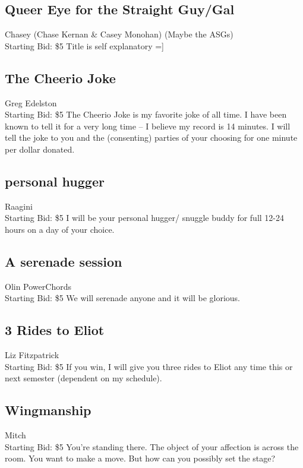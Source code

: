 \documentclass[11pt]{article}
\begin{document}
\subsection{Queer Eye for the Straight Guy/Gal}
Chasey (Chase Kernan  \& Casey Monohan) (Maybe the ASGs)
\\
Starting Bid: \$5
\newline
Title is self explanatory =]
\subsection{The Cheerio Joke}
Greg Edelston
\\
Starting Bid: \$5
\newline
The Cheerio Joke is my favorite joke of all time. I have been known to tell it for a very long time -- I believe my record is 14 minutes. I will tell the joke to you and the (consenting) parties of your choosing for one minute per dollar donated.
\subsection{personal hugger}
Raagini
\\
Starting Bid: \$5
\newline
I will be your personal hugger/ snuggle buddy for full 12-24 hours on a day of your choice.
\subsection{A serenade session}
Olin PowerChords
\\
Starting Bid: \$5
\newline
We will serenade anyone and it will be glorious.
\subsection{3 Rides to Eliot}
Liz Fitzpatrick
\\
Starting Bid: \$5
\newline
If you win, I will give you three rides to Eliot any time this or next semester (dependent on my schedule).
\subsection{Wingmanship}
Mitch
\\
Starting Bid: \$5
\newline
You're standing there. The object of your affection is across the room. You want to make a move. But how can you possibly set the stage?
\end{document}
